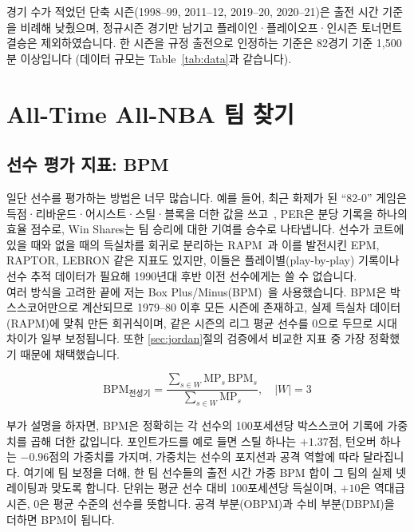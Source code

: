 \documentclass[conference,a4paper]{IEEEtran}
\begin{document}
경기 수가 적었던 단축 시즌(1998--99, 2011--12, 2019--20, 2020--21)은 출전 시간 기준을 비례해 낮췄으며, 정규시즌 경기만 남기고 플레이인·플레이오프·인시즌 토너먼트 결승은 제외하였습니다. 한 시즌을 규정 출전으로 인정하는 기준은 82경기 기준 1{,}500분 이상입니다 (데이터 규모는 Table~\ref{tab:data}과 같습니다).



\section{All-Time All-NBA 팀 찾기}

\subsection{선수 평가 지표: BPM}\label{sec:bpm}
일단 선수를 평가하는 방법은 너무 많습니다. 예를 들어, 최근 화제가 된 ``82-0'' 게임은 득점·리바운드·어시스트·스틸·블록을 더한 값을 쓰고~\cite{game820}, PER은 분당 기록을 하나의 효율 점수로, Win Shares는 팀 승리에 대한 기여를 승수로 나타냅니다. 선수가 코트에 있을 때와 없을 때의 득실차를 회귀로 분리하는 RAPM~\cite{sill}과 이를 발전시킨 EPM, RAPTOR, LEBRON 같은 지표도 있지만, 이들은 플레이별(play-by-play) 기록이나 선수 추적 데이터가 필요해 1990년대 후반 이전 선수에게는 쓸 수 없습니다.\\

여러 방식을 고려한 끝에 저는 Box Plus/Minus(BPM)~\cite{bpm}을 사용했습니다. BPM은 박스스코어만으로 계산되므로 1979--80 이후 모든 시즌에 존재하고, 실제 득실차 데이터(RAPM)에 맞춰 만든 회귀식이며, 같은 시즌의 리그 평균 선수를 0으로 두므로 시대 차이가 일부 보정됩니다. 또한 \ref{sec:jordan}절의 검증에서 비교한 지표 중 가장 정확했기 때문에 채택했습니다.

\begin{equation}
\mathrm{BPM}_{\text{전성기}} = \frac{\sum_{s \in W} \mathrm{MP}_s \, \mathrm{BPM}_s}{\sum_{s \in W} \mathrm{MP}_s},\quad |W| = 3
\label{eq:prime}
\end{equation}

부가 설명을 하자면, BPM은 정확히는 각 선수의 100포세션당 박스스코어 기록에 가중치를 곱해 더한 값입니다. 포인트가드를 예로 들면 스틸 하나는 $+1.37$점, 턴오버 하나는 $-0.96$점의 가중치를 가지며, 가중치는 선수의 포지션과 공격 역할에 따라 달라집니다. 여기에 팀 보정을 더해, 한 팀 선수들의 출전 시간 가중 BPM 합이 그 팀의 실제 넷레이팅과 맞도록 합니다. 단위는 평균 선수 대비 100포세션당 득실이며, $+10$은 역대급 시즌, 0은 평균 수준의 선수를 뜻합니다. 공격 부분(OBPM)과 수비 부분(DBPM)을 더하면 BPM이 됩니다.\\
\end{document}
